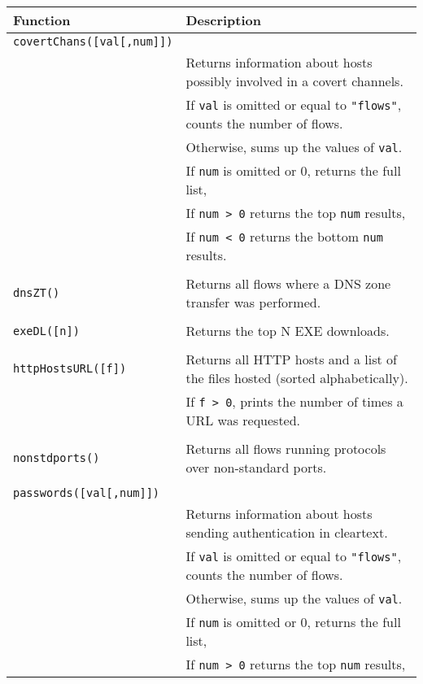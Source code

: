 \documentclass[documentation]{subfiles}
\begin{document}
\begin{longtable}{ll}
    \toprule
    {\bf Function} & {\bf Description}\\
    \midrule\endhead%
    {\tt covertChans([val[,num]])}\\
                             & Returns information about hosts possibly involved in a covert channels.\\
                             & If {\tt val} is omitted or equal to {\tt "flows"}, counts the number of flows.\\
                             & Otherwise, sums up the values of {\tt val}.\\
                             & If {\tt num} is omitted or 0, returns the full list,\\
                             & If {\tt num > 0} returns the top {\tt num} results,\\
                             & If {\tt num < 0} returns the bottom {\tt num} results.\\\\
    {\tt dnsZT()}            & Returns all flows where a DNS zone transfer was performed.\\\\
    {\tt exeDL([n])}         & Returns the top N EXE downloads.\\\\
    {\tt httpHostsURL([f])}  & Returns all HTTP hosts and a list of the files hosted (sorted alphabetically).\\
                             & If {\tt f > 0}, prints the number of times a URL was requested.\\\\
    {\tt nonstdports()}      & Returns all flows running protocols over non-standard ports.\\\\
    {\tt passwords([val[,num]])}\\
                             & Returns information about hosts sending authentication in cleartext.\\
                             & If {\tt val} is omitted or equal to {\tt "flows"}, counts the number of flows.\\
                             & Otherwise, sums up the values of {\tt val}.\\
                             & If {\tt num} is omitted or 0, returns the full list,\\
                             & If {\tt num > 0} returns the top {\tt num} results,\\

\end{longtable}
\end{document}
